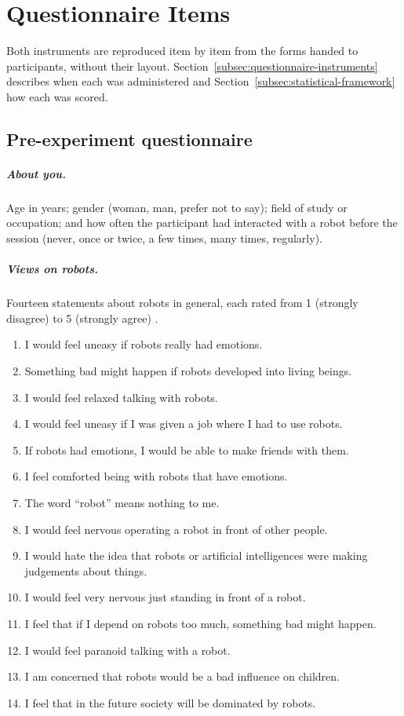 \chapter{Questionnaire Items}
\label{app:questionnaires}

Both instruments are reproduced item by item from the forms handed to participants, without their layout. Section~\ref{subsec:questionnaire-instruments} describes when each was administered and Section~\ref{subsec:statistical-framework} how each was scored.

\section{Pre-experiment questionnaire}

\paragraph{About you.} Age in years; gender (woman, man, prefer not to say); field of study or occupation; and how often the participant had interacted with a robot before the session (never, once or twice, a few times, many times, regularly).

\paragraph{Views on robots.} Fourteen statements about robots in general, each rated from 1 (strongly disagree) to 5 (strongly agree) \citep{Nomura2006NARS}.

\begin{enumerate}\setlength{\itemsep}{0pt}\setlength{\parskip}{0pt}
    \item I would feel uneasy if robots really had emotions.
    \item Something bad might happen if robots developed into living beings.
    \item I would feel relaxed talking with robots.
    \item I would feel uneasy if I was given a job where I had to use robots.
    \item If robots had emotions, I would be able to make friends with them.
    \item I feel comforted being with robots that have emotions.
    \item The word ``robot'' means nothing to me.
    \item I would feel nervous operating a robot in front of other people.
    \item I would hate the idea that robots or artificial intelligences were making judgements about things.
    \item I would feel very nervous just standing in front of a robot.
    \item I feel that if I depend on robots too much, something bad might happen.
    \item I would feel paranoid talking with a robot.
    \item I am concerned that robots would be a bad influence on children.
    \item I feel that in the future society will be dominated by robots.
\end{enumerate}

